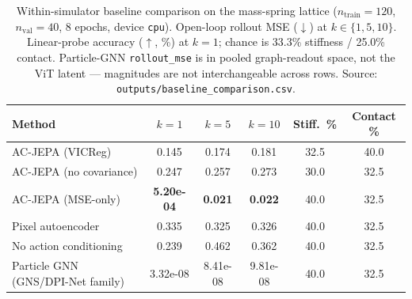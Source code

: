 \begin{table}[t]
  \centering
  \small
  \caption{Within-simulator baseline comparison on the mass-spring lattice ($n_{\mathrm{train}}=120$, $n_{\mathrm{val}}=40$, 8 epochs, device \texttt{cpu}). Open-loop rollout MSE ($\downarrow$) at $k\in\{1,5,10\}$. Linear-probe accuracy ($\uparrow$, \%) at $k{=}1$; chance is 33.3\% stiffness / 25.0\% contact. Particle-GNN \texttt{rollout\_mse} is in pooled graph-readout space, not the ViT latent --- magnitudes are not interchangeable across rows. Source: \texttt{outputs/baseline\_comparison.csv}.}
  \label{tab:baselines}
  \setlength{\tabcolsep}{3.5pt}
  \begin{tabular}{lccccc}
    \toprule
    Method & $k{=}1$ & $k{=}5$ & $k{=}10$ & Stiff.\ \% & Contact \% \\
    \midrule
    AC-JEPA (VICReg) & 0.145 & 0.174 & 0.181 & 32.5 & 40.0 \\
    AC-JEPA (no covariance) & 0.247 & 0.257 & 0.273 & 30.0 & 32.5 \\
    AC-JEPA (MSE-only) & \textbf{5.20e-04} & \textbf{0.021} & \textbf{0.022} & 40.0 & 32.5 \\
    Pixel autoencoder & 0.335 & 0.325 & 0.326 & 40.0 & 32.5 \\
    No action conditioning & 0.239 & 0.462 & 0.362 & 40.0 & 32.5 \\
    Particle GNN (GNS/DPI-Net family) & 3.32e-08 & 8.41e-08 & 9.81e-08 & 40.0 & 32.5 \\
    \bottomrule
  \end{tabular}
\end{table}
